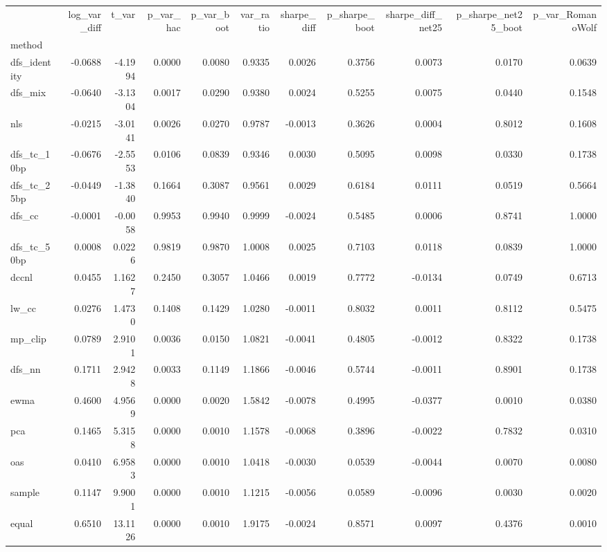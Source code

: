 \begin{tabular}{lrrrrrrrrrr}
\toprule
 & log_var_diff & t_var & p_var_hac & p_var_boot & var_ratio & sharpe_diff & p_sharpe_boot & sharpe_diff_net25 & p_sharpe_net25_boot & p_var_RomanoWolf \\
method &  &  &  &  &  &  &  &  &  &  \\
\midrule
dfs_identity & -0.0688 & -4.1994 & 0.0000 & 0.0080 & 0.9335 & 0.0026 & 0.3756 & 0.0073 & 0.0170 & 0.0639 \\
dfs_mix & -0.0640 & -3.1304 & 0.0017 & 0.0290 & 0.9380 & 0.0024 & 0.5255 & 0.0075 & 0.0440 & 0.1548 \\
nls & -0.0215 & -3.0141 & 0.0026 & 0.0270 & 0.9787 & -0.0013 & 0.3626 & 0.0004 & 0.8012 & 0.1608 \\
dfs_tc_10bp & -0.0676 & -2.5553 & 0.0106 & 0.0839 & 0.9346 & 0.0030 & 0.5095 & 0.0098 & 0.0330 & 0.1738 \\
dfs_tc_25bp & -0.0449 & -1.3840 & 0.1664 & 0.3087 & 0.9561 & 0.0029 & 0.6184 & 0.0111 & 0.0519 & 0.5664 \\
dfs_cc & -0.0001 & -0.0058 & 0.9953 & 0.9940 & 0.9999 & -0.0024 & 0.5485 & 0.0006 & 0.8741 & 1.0000 \\
dfs_tc_50bp & 0.0008 & 0.0226 & 0.9819 & 0.9870 & 1.0008 & 0.0025 & 0.7103 & 0.0118 & 0.0839 & 1.0000 \\
dccnl & 0.0455 & 1.1627 & 0.2450 & 0.3057 & 1.0466 & 0.0019 & 0.7772 & -0.0134 & 0.0749 & 0.6713 \\
lw_cc & 0.0276 & 1.4730 & 0.1408 & 0.1429 & 1.0280 & -0.0011 & 0.8032 & 0.0011 & 0.8112 & 0.5475 \\
mp_clip & 0.0789 & 2.9101 & 0.0036 & 0.0150 & 1.0821 & -0.0041 & 0.4805 & -0.0012 & 0.8322 & 0.1738 \\
dfs_nn & 0.1711 & 2.9428 & 0.0033 & 0.1149 & 1.1866 & -0.0046 & 0.5744 & -0.0011 & 0.8901 & 0.1738 \\
ewma & 0.4600 & 4.9569 & 0.0000 & 0.0020 & 1.5842 & -0.0078 & 0.4995 & -0.0377 & 0.0010 & 0.0380 \\
pca & 0.1465 & 5.3158 & 0.0000 & 0.0010 & 1.1578 & -0.0068 & 0.3896 & -0.0022 & 0.7832 & 0.0310 \\
oas & 0.0410 & 6.9583 & 0.0000 & 0.0010 & 1.0418 & -0.0030 & 0.0539 & -0.0044 & 0.0070 & 0.0080 \\
sample & 0.1147 & 9.9001 & 0.0000 & 0.0010 & 1.1215 & -0.0056 & 0.0589 & -0.0096 & 0.0030 & 0.0020 \\
equal & 0.6510 & 13.1126 & 0.0000 & 0.0010 & 1.9175 & -0.0024 & 0.8571 & 0.0097 & 0.4376 & 0.0010 \\
\bottomrule
\end{tabular}
